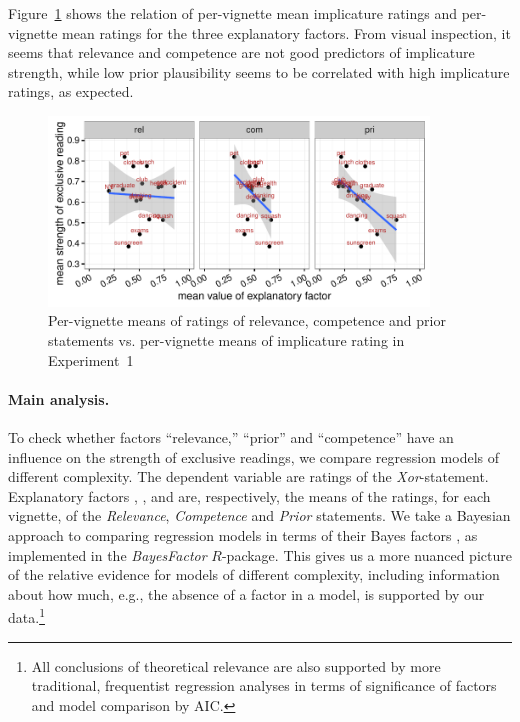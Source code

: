 \documentclass[12pt]{article}
\begin{document}
Figure~\ref{fig:correlationsExp1} shows the relation of per-vignette mean implicature ratings
and per-vignette mean ratings for the three explanatory factors. From visual inspection, it
seems that relevance and competence are not good predictors of implicature strength, while low prior
plausibility seems to be correlated with high implicature ratings, as expected.

\begin{figure}[t]
  \centering

  \includegraphics[width = 0.9\textwidth]{pics/correlationExp1.pdf}
  
  \caption{Per-vignette means of ratings of relevance, competence and prior statements
    vs. per-vignette means of implicature rating in Experiment~1}
  \label{fig:correlationsExp1}
\end{figure}

\paragraph{Main analysis.} To check whether factors ``relevance,'' ``prior'' and ``competence''
have an influence on the strength of exclusive readings, we compare regression models of
different complexity. The dependent variable are ratings of the
\emph{Xor}-statement. Explanatory factors \rel, \com, and \pri are, respectively, the means of
the ratings, for each vignette, of the \emph{Relevance}, \emph{Competence} and \emph{Prior}
statements. We take a Bayesian approach to comparing regression models in terms of their Bayes
factors \citep{RouderMorey2012:Default-Bayes-F}, as implemented in the \emph{BayesFactor}
$R$-package. This gives us a more nuanced picture of the relative evidence for models of
different complexity, including information about how much, e.g., the absence of a factor in a
model, is supported by our data.\footnote{All conclusions of theoretical relevance are also
  supported by more traditional, frequentist regression analyses in terms of significance of
  factors and model comparison by AIC.}
\end{document}
